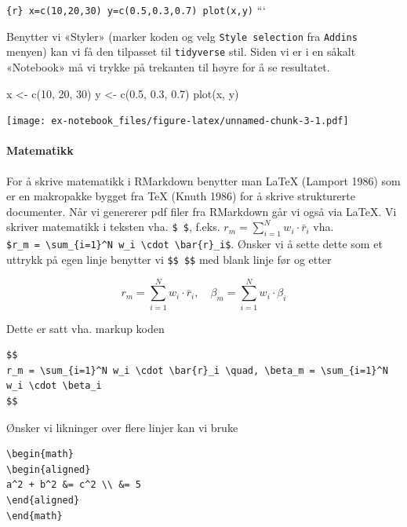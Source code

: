 \documentclass[
]{article}
\newenvironment{Shaded}{\begin{snugshade}}{\end{snugshade}}
\newcommand{\DecValTok}[1]{\textcolor[rgb]{0.00,0.00,0.81}{#1}}
\newcommand{\FloatTok}[1]{\textcolor[rgb]{0.00,0.00,0.81}{#1}}
\newcommand{\FunctionTok}[1]{\textcolor[rgb]{0.00,0.00,0.00}{#1}}
\newcommand{\NormalTok}[1]{#1}
\newcommand{\OtherTok}[1]{\textcolor[rgb]{0.56,0.35,0.01}{#1}}
\begin{document}
\texttt{\textasciigrave{}\textasciigrave{}\textasciigrave{}\{r\}\ x=c(10,20,30)\ y=c(0.5,0.3,0.7)\ plot(x,y)}
```

Benytter vi «Styler» (marker koden og velg \texttt{Style\ selection} fra
\texttt{Addins} menyen) kan vi få den tilpasset til \texttt{tidyverse}
stil. Siden vi er i en såkalt «Notebook» må vi trykke på trekanten til
høyre for å se resultatet.

\begin{Shaded}
\begin{Highlighting}[]
\NormalTok{x }\OtherTok{\textless{}{-}} \FunctionTok{c}\NormalTok{(}\DecValTok{10}\NormalTok{, }\DecValTok{20}\NormalTok{, }\DecValTok{30}\NormalTok{)}
\NormalTok{y }\OtherTok{\textless{}{-}} \FunctionTok{c}\NormalTok{(}\FloatTok{0.5}\NormalTok{, }\FloatTok{0.3}\NormalTok{, }\FloatTok{0.7}\NormalTok{)}
\FunctionTok{plot}\NormalTok{(x, y)}
\end{Highlighting}
\end{Shaded}

\texttt{[image: ex-notebook\_files/figure-latex/unnamed-chunk-3-1.pdf]}

\hypertarget{matematikk}{%
\paragraph{Matematikk}\label{matematikk}}

For å skrive matematikk i RMarkdown benytter man LaTeX (Lamport 1986)
som er en makropakke bygget fra TeX (Knuth 1986) for å skrive
strukturerte documenter. Når vi genererer pdf filer fra RMarkdown går vi
også via LaTeX. Vi skriver matematikk i teksten vha. \texttt{\$\ \$},
f.eks. \(r_m = \sum_{i=1}^N w_i \cdot \bar{r}_i\) vha.
\texttt{\$r\_m\ =\ \textbackslash{}sum\_\{i=1\}\^{}N\ w\_i\ \textbackslash{}cdot\ \textbackslash{}bar\{r\}\_i\$}.
Ønsker vi å sette dette som et uttrykk på egen linje benytter vi
\texttt{\$\$\ \$\$} med blank linje før og etter

\[
r_m = \sum_{i=1}^N w_i \cdot \bar{r}_i, \quad
\beta_m = \sum_{i=1}^N w_i \cdot \beta_i
\]

Dette er satt vha. markup koden

\begin{verbatim}
$$
r_m = \sum_{i=1}^N w_i \cdot \bar{r}_i \quad, \beta_m = \sum_{i=1}^N w_i \cdot \beta_i
$$
\end{verbatim}

Ønsker vi likninger over flere linjer kan vi bruke

\begin{verbatim}
\begin{math}
\begin{aligned}
a^2 + b^2 &= c^2 \\ &= 5
\end{aligned}
\end{math}
\end{verbatim}
\end{document}
